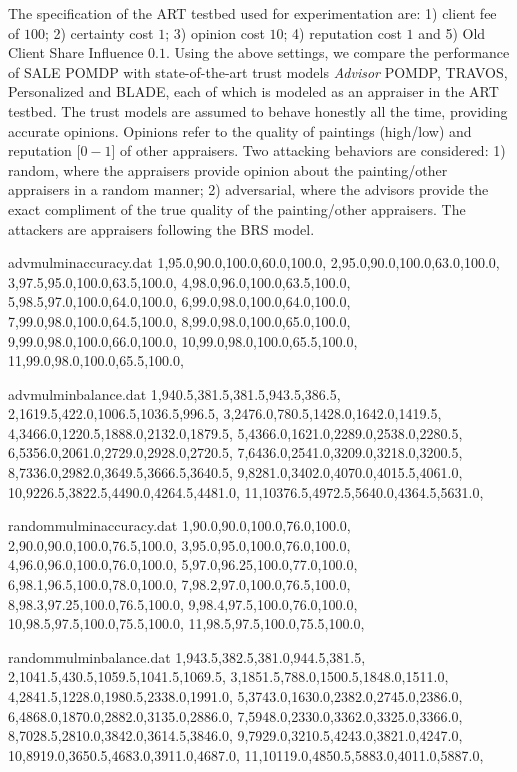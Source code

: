 \documentclass{aamas2014}
\providecommand{\SALEP}{SALE POMDP}
\begin{document}
  The specification of the ART testbed used for experimentation are:  1) client fee of $100$; 2) certainty cost $1$; 3) opinion cost $10$; 4) reputation cost $1$ and 5) Old Client Share Influence $0.1$. Using the above settings, we compare the performance of \SALEP{} with state-of-the-art trust models \textit{Advisor} POMDP, TRAVOS, Personalized and BLADE, each of which is modeled as an appraiser in the ART testbed. The trust models are assumed to behave honestly all the time, providing accurate opinions. Opinions refer to the quality of paintings (high/low) and reputation [$0-1$] of other appraisers.  Two attacking behaviors are considered: 1) random, where the appraisers provide opinion about the painting/other appraisers in a random manner; 2) adversarial, where the advisors provide the exact compliment of the true quality of the painting/other appraisers. The attackers are appraisers following the BRS model.
  \begin{filecontents}{advmulminaccuracy.dat}
1,95.0,90.0,100.0,60.0,100.0,
2,95.0,90.0,100.0,63.0,100.0,
3,97.5,95.0,100.0,63.5,100.0,
4,98.0,96.0,100.0,63.5,100.0,
5,98.5,97.0,100.0,64.0,100.0,
6,99.0,98.0,100.0,64.0,100.0,
7,99.0,98.0,100.0,64.5,100.0,
8,99.0,98.0,100.0,65.0,100.0,
9,99.0,98.0,100.0,66.0,100.0,
10,99.0,98.0,100.0,65.5,100.0,
11,99.0,98.0,100.0,65.5,100.0,
\end{filecontents}
\begin{filecontents}{advmulminbalance.dat}
1,940.5,381.5,381.5,943.5,386.5,
2,1619.5,422.0,1006.5,1036.5,996.5,
3,2476.0,780.5,1428.0,1642.0,1419.5,
4,3466.0,1220.5,1888.0,2132.0,1879.5,
5,4366.0,1621.0,2289.0,2538.0,2280.5,
6,5356.0,2061.0,2729.0,2928.0,2720.5,
7,6436.0,2541.0,3209.0,3218.0,3200.5,
8,7336.0,2982.0,3649.5,3666.5,3640.5,
9,8281.0,3402.0,4070.0,4015.5,4061.0,
10,9226.5,3822.5,4490.0,4264.5,4481.0,
11,10376.5,4972.5,5640.0,4364.5,5631.0,
\end{filecontents}
\begin{filecontents}{randommulminaccuracy.dat}
1,90.0,90.0,100.0,76.0,100.0,
2,90.0,90.0,100.0,76.5,100.0,
3,95.0,95.0,100.0,76.0,100.0,
4,96.0,96.0,100.0,76.0,100.0,
5,97.0,96.25,100.0,77.0,100.0,
6,98.1,96.5,100.0,78.0,100.0,
7,98.2,97.0,100.0,76.5,100.0,
8,98.3,97.25,100.0,76.5,100.0,
9,98.4,97.5,100.0,76.0,100.0,
10,98.5,97.5,100.0,75.5,100.0,
11,98.5,97.5,100.0,75.5,100.0,
\end{filecontents}
\begin{filecontents}{randommulminbalance.dat}
1,943.5,382.5,381.0,944.5,381.5,
2,1041.5,430.5,1059.5,1041.5,1069.5,
3,1851.5,788.0,1500.5,1848.0,1511.0,
4,2841.5,1228.0,1980.5,2338.0,1991.0,
5,3743.0,1630.0,2382.0,2745.0,2386.0,
6,4868.0,1870.0,2882.0,3135.0,2886.0,
7,5948.0,2330.0,3362.0,3325.0,3366.0,
8,7028.5,2810.0,3842.0,3614.5,3846.0,
9,7929.0,3210.5,4243.0,3821.0,4247.0,
10,8919.0,3650.5,4683.0,3911.0,4687.0,
11,10119.0,4850.5,5883.0,4011.0,5887.0,
\end{filecontents}
\end{document}
